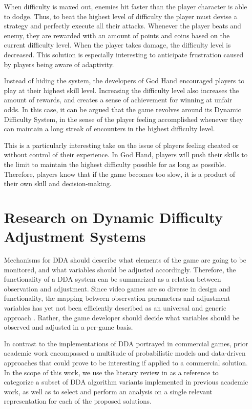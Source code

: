 When difficulty is maxed out, enemies hit faster than the player character is able to dodge. Thus, to beat the highest level of difficulty the player must devise a strategy and perfectly execute all their attacks. Whenever the player beats and enemy, they are rewarded with an amount of points and coins based on the current difficulty level. When the player takes damage, the difficulty level is decreased. This solution is especially interesting to anticipate frustration caused by players being aware of adaptivity. 

Instead of hiding the system, the developers of God Hand encouraged players to play at their highest skill level. Increasing the difficulty level also increases the amount of rewards, and creates a sense of achievement for winning at unfair odds. In this case, it can be argued that the game revolves around its Dynamic Difficulty System, in the sense of the player feeling accomplished whenever they can maintain a long streak of encounters in the highest difficulty level. 

This is a particularly interesting take on the issue of players feeling cheated or without control of their experience. In God Hand, players will push their skills to the limit to maintain the highest difficulty possible for as long as possible. Therefore, players know that if the game becomes too slow, it is a product of their own skill and decision-making.

\section{Research on Dynamic Difficulty Adjustment Systems}

Mechanisms for DDA should describe what elements of the game are going to be monitored, and what variables should be adjusted accordingly. Therefore, the functionality of a DDA system can be summarized as a relation between observation and adjustment. Since video games are so diverse in design and functionality, the mapping between observation parameters and adjustment variables has yet not been efficiently described as an universal and generic approach \cite{PHD_DynamicDifficultyAdjustment}. Rather, the game developer should decide what variables should be observed and adjusted in a per-game basis.

In contrast to the implementations of DDA portrayed in commercial games, prior academic work encompassed a multitude of probabilistic models and data-driven approaches that could prove to be interesting if applied to a commercial solution. In the scope of this work, we use the literary review in \cite{article_ddareview} as a reference to categorize a subset of DDA algorithm variants implemented in previous academic work, as well as to select and perform an analysis on a single relevant representation for each of the proposed solutions.

